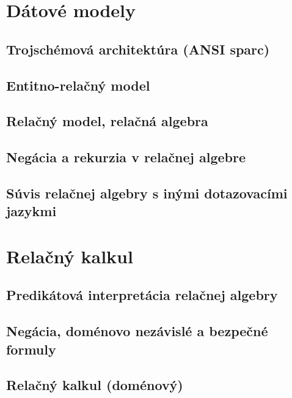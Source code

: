 \documentclass[10pt,a4paper]{article}
\begin{document}
\section{Dátové modely} 
\subsection{Trojschémová architektúra (ANSI sparc)}
\subsection{Entitno-relačný model}
\subsection{Relačný model, relačná algebra}
\subsection{Negácia a rekurzia v relačnej algebre}
\subsection{Súvis relačnej algebry s inými dotazovacími jazykmi}
    
\section{Relačný kalkul} 
\subsection{Predikátová interpretácia relačnej algebry}
\subsection{Negácia, doménovo nezávislé a bezpečné formuly}
\subsection{Relačný kalkul (doménový)}
\end{document}
